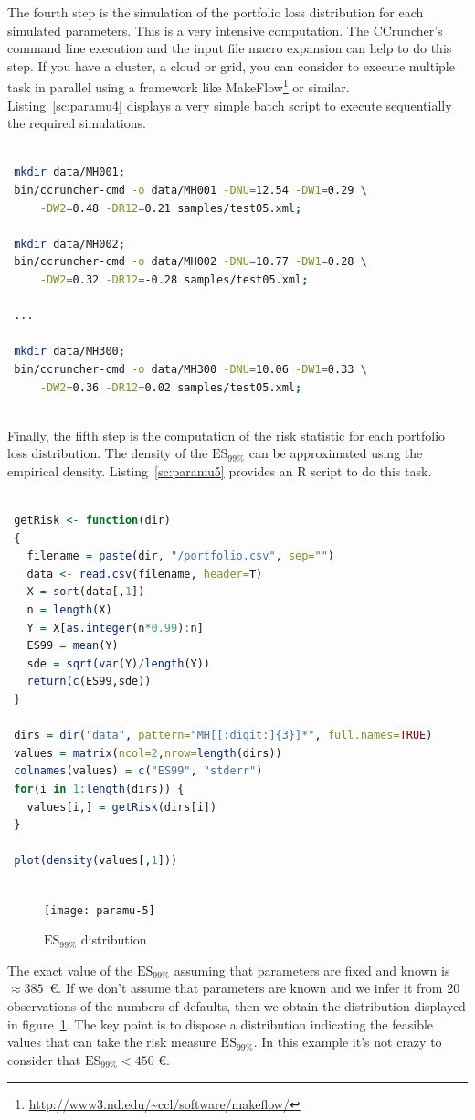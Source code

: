 \documentclass[11pt,fleqn]{book} %
\begin{document}
\begin{example}
	The fourth step is the simulation of the portfolio loss distribution
	for each simulated parameters. This is a very intensive computation.
	The CCruncher's command line execution and the input file macro expansion
	can help to do this step. If you have a cluster, a cloud or grid, you can 
	consider to execute multiple task in parallel using a framework like 
	MakeFlow\footnote{\url{http://www3.nd.edu/~ccl/software/makeflow/}} 
	or similar. Listing~\ref{sc:paramu4} displays a very simple batch
	script to execute sequentially the required simulations.
	\begin{lstlisting}[language=bash, label={sc:paramu4}, caption={Execution of multiple CCrunchers (bash script)}]
 
 mkdir data/MH001;
 bin/ccruncher-cmd -o data/MH001 -DNU=12.54 -DW1=0.29 \
     -DW2=0.48 -DR12=0.21 samples/test05.xml; 
 
 mkdir data/MH002; 
 bin/ccruncher-cmd -o data/MH002 -DNU=10.77 -DW1=0.28 \
     -DW2=0.32 -DR12=-0.28 samples/test05.xml; 

 ...

 mkdir data/MH300; 
 bin/ccruncher-cmd -o data/MH300 -DNU=10.06 -DW1=0.33 \
     -DW2=0.36 -DR12=0.02 samples/test05.xml; 
 
	\end{lstlisting}

	Finally, the fifth step is the computation of the risk statistic
	for each portfolio loss distribution. The density of the $\text{ES}_{99\%}$ 
	can be approximated using the empirical density. Listing~\ref{sc:paramu5}
	provides an R script to do this task. 
	\begin{lstlisting}[language=R, label={sc:paramu5}, caption={$ES_{99\%}$ distribution (R script)}]

 getRisk <- function(dir)
 {
   filename = paste(dir, "/portfolio.csv", sep="")
   data <- read.csv(filename, header=T)
   X = sort(data[,1])
   n = length(X)
   Y = X[as.integer(n*0.99):n]
   ES99 = mean(Y)
   sde = sqrt(var(Y)/length(Y))
   return(c(ES99,sde))
 }

 dirs = dir("data", pattern="MH[[:digit:]{3}]*", full.names=TRUE)
 values = matrix(ncol=2,nrow=length(dirs))
 colnames(values) = c("ES99", "stderr")
 for(i in 1:length(dirs)) {
   values[i,] = getRisk(dirs[i])
 }
 
 plot(density(values[,1]))
 
	\end{lstlisting}
	\begin{figure}[!ht]
		\centering
		\texttt{[image: paramu-5]}
		\caption{$\text{ES}_{99\%}$ distribution}
		\label{fig:paramu5}
	\end{figure}
	The exact value of the $\text{ES}_{99\%}$ assuming that parameters 
	are fixed and known is $\approx 385$\ \euro. If we don't assume that 
	parameters are known and we infer it from 20 observations of the
	numbers of defaults, then we obtain the distribution displayed in
	figure~\ref{fig:paramu5}. 
	The key point is to dispose a distribution indicating the 
	feasible values that can take the risk measure $\text{ES}_{99\%}$.
	In this example it's not crazy to consider that 
	$\text{ES}_{99\%} < 450$ \euro.
\end{example}
\end{document}
